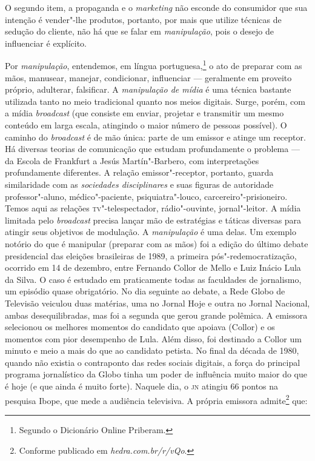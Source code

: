 O segundo item, a propaganda e o \textit{marketing} não esconde do
consumidor que sua intenção é vender"-lhe produtos, portanto, por mais
que utilize técnicas de sedução do cliente, não há que se falar em
\textit{manipulação}, pois o desejo de influenciar é explícito.

Por \textit{manipulação}, entendemos, em língua portuguesa,\footnote{Segundo o Dicionário Online Priberam.} o
ato de preparar com as mãos, manusear, manejar, condicionar, influenciar
--- geralmente em proveito próprio, adulterar, falsificar. A
\textit{manipulação de mídia} é uma técnica bastante utilizada tanto no
meio tradicional quanto nos meios digitais. Surge, porém, com a mídia
\textit{broadcast} (que consiste em enviar, projetar e transmitir um mesmo
conteúdo em larga escala, atingindo o maior número de pessoas possível).
O caminho do \textit{broadcast} é de mão única: parte de um emissor e
atinge um receptor. Há diversas teorias de comunicação que estudam
profundamente o problema --- da Escola de Frankfurt a Jesús
Martín"-Barbero, com interpretações profundamente diferentes. A relação
emissor"-receptor, portanto, guarda similaridade com as \textit{sociedades
disciplinares} e suas figuras de autoridade professor"-aluno,
médico"-paciente, psiquiatra"-louco, carcereiro"-prisioneiro. Temos aqui as
relações \textsc{tv}"-telespectador, rádio"-ouvinte, jornal"-leitor. A mídia
limitada pelo \textit{broadcast} precisa lançar mão de estratégias e
táticas diversas para atingir seus objetivos de modulação. A
\textit{manipulação} é uma delas. Um exemplo notório do que é manipular
(preparar com as mãos) foi a edição do último debate presidencial das
eleições brasileiras de 1989, a primeira pós"-redemocratização, ocorrido
em 14 de dezembro, entre Fernando Collor de Mello e Luiz Inácio Lula da
Silva. O caso é estudado em praticamente todas as faculdades de
jornalismo, um episódio quase obrigatório. No dia seguinte ao debate, a
Rede Globo de Televisão veiculou duas matérias, uma no Jornal Hoje e
outra no Jornal Nacional, ambas desequilibradas, mas foi a segunda que
gerou grande polêmica. A emissora selecionou os melhores momentos do
candidato que apoiava (Collor) e os momentos com pior desempenho de Lula. 
Além disso, foi destinado a Collor um minuto e meio a mais do que ao
candidato petista. No final da década de 1980, quando não existia o
contraponto das redes sociais digitais, a força do principal programa
jornalístico da Globo tinha um poder de influência muito maior do que é
hoje (e que ainda é muito forte). Naquele dia, o \textsc{jn} atingiu 66 pontos na
pesquisa Ibope, que mede a audiência televisiva. A própria emissora admite\footnote{Conforme publicado em \textit{hedra.com.br/r/vQo}.} que:

